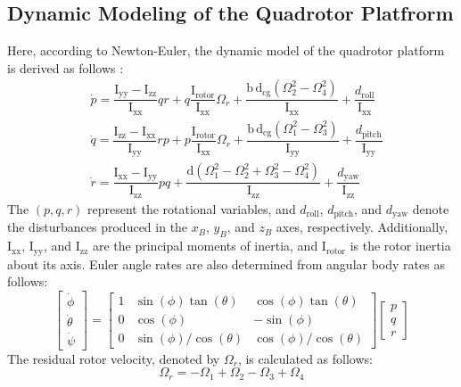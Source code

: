 \documentclass[preprint,12pt,authoryear]{elsarticle}
\begin{document}
\subsection{Dynamic Modeling of the Quadrotor Platfrorm}
\noindent Here, according to Newton-Euler, the dynamic model of the quadrotor platform is derived as follows \citep{4399042, article_Bouabdallah}:
\begin{align}
&\dot p = \dfrac{\mathrm{I}_{\text{yy}} - \mathrm{I}_{\text{zz}}}
{\mathrm{I}_{\text{xx}}} qr + q \dfrac{\mathrm{I}_{\text{rotor}}}
{\mathrm{I}_{\text{xx}}}\Omega_r + \dfrac{\mathrm{b\,d}_{\text{cg}} (\Omega_2^2 - \Omega_4^2)}{\mathrm{I}
_{\text{xx}}} + \dfrac{d_{\text{roll}}}{\mathrm{I}_{\text{xx}}}
\\
&\dot q = \dfrac{\mathrm{I}_{\text{zz}} - 
\mathrm{I}_{\text{xx}}}{\mathrm{I}_{\text{yy}}} rp +
p \dfrac{\mathrm{I}_{\text{rotor}}}{\mathrm{I}_{\text{xx}}}\Omega_r + 
\dfrac{\mathrm{b\,d}_{\text{cg}} (\Omega_1^2 - \Omega_3^2)}{\mathrm{I}_{\text{yy}}} +
\dfrac{d_{\text{pitch}}}{\mathrm{I}_{\text{yy}}}
\\
&\dot r = \dfrac{\mathrm{I}_{\text{xx}} -
\mathrm{I}_{\text{yy}}}{\mathrm{I}_{\text{zz}}} pq 
+  \dfrac{\mathrm{d} (\Omega_1^2 - \Omega_2^2 + \Omega_3^2 - \Omega_4^2)}{\mathrm{I}_{\text{zz}}} 
+ \dfrac{d_{\text{yaw}}}{\mathrm{I}_{\text{zz}}}
\end{align}
The $(p, q, r)$ represent the rotational variables, and $d_{\text{roll}}$, $d_{\text{pitch}}$, and $d_{\text{yaw}}$ denote the disturbances produced in the $x_B$, $y_B$, and $z_B$ axes, respectively. Additionally, $\mathrm{I}_{\text{xx}}$, $\mathrm{I}_{\text{yy}}$, and $\mathrm{I}_{\text{zz}}$ are the principal moments of inertia, and $\mathrm{I}_{\text{rotor}}$ is the rotor inertia about its axis. Euler angle rates are also determined from angular body rates as follows:
\begin{equation}
	\begin{bmatrix}
	\dot\phi \\
	\dot\theta \\
	\dot\psi
	\end{bmatrix} = 
	\begin{bmatrix}
	1 & \sin(\phi)\tan(\theta) & \cos(\phi)\tan(\theta) \\
	0 & \cos(\phi) & -\sin(\phi) \\
	0 & \sin(\phi)/\cos(\theta) & \cos(\phi)/\cos(\theta)
	\end{bmatrix}
	\begin{bmatrix}
	p \\
	q \\
	r
	\end{bmatrix}
\end{equation}
The residual rotor velocity, denoted by $\Omega_r$, is calculated as follows:
\begin{equation}
	\Omega_r = -\Omega_1 + \Omega_2 - \Omega_3 + \Omega_4
\end{equation}
\end{document}
